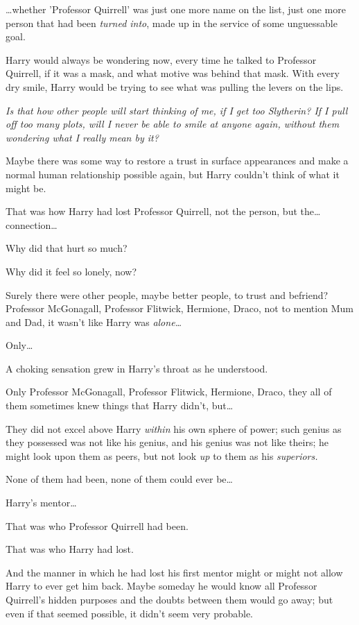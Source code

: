 {\ldots}whether 'Professor Quirrell' was just one more name on the list, just 
one more person that had been \emph{turned into}, made up in the service of 
some unguessable goal.

Harry would always be wondering now, every time he talked to Professor 
Quirrell, if it was a mask, and what motive was behind that mask. With every 
dry smile, Harry would be trying to see what was pulling the levers on the lips.

\emph{Is that how other people will start thinking of me, if I get too 
Slytherin? If I pull off too many plots, will I never be able to smile at 
anyone again, without them wondering what I really mean by it?}

Maybe there was some way to restore a trust in surface appearances and make a 
normal human relationship possible again, but Harry couldn't think of what it 
might be.

That was how Harry had lost Professor Quirrell, not the person, but the{\ldots} 
connection{\ldots}

Why did that hurt so much?

Why did it feel so lonely, now?

Surely there were other people, maybe better people, to trust and befriend? 
Professor McGonagall, Professor Flitwick, Hermione, Draco, not to mention Mum 
and Dad, it wasn't like Harry was \emph{alone{\ldots}}

Only{\ldots}

A choking sensation grew in Harry's throat as he understood.

Only Professor McGonagall, Professor Flitwick, Hermione, Draco, they all of 
them sometimes knew things that Harry didn't, but{\ldots}

They did not excel above Harry \emph{within} his own sphere of power; such 
genius as they possessed was not like his genius, and his genius was not like 
theirs; he might look upon them as peers, but not look \emph{up} to them as his 
\emph{superiors.}

None of them had been, none of them could ever be{\ldots}

Harry's mentor{\ldots}

That was who Professor Quirrell had been.

That was who Harry had lost.

And the manner in which he had lost his first mentor might or might not allow 
Harry to ever get him back. Maybe someday he would know all Professor 
Quirrell's hidden purposes and the doubts between them would go away; but even 
if that seemed possible, it didn't seem very probable.

